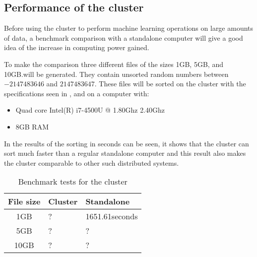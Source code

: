 \subsection{Performance of the cluster}\label{sec:benchmark}
Before using the cluster to perform machine learning operations on large amounts of data, a benchmark comparison with a standalone computer will give a good idea of the increase in computing power gained.

To make the comparison three different files of the sizes 1GB, 5GB, and 10GB.\@ will be generated. They contain unsorted random numbers between $-2147483646$ and $2147483647$. These files will be sorted on the cluster with the specifications seen in , and on a computer with:
\begin{itemize}
\item Quad core Intel(R) i7-4500U @ 1.80Ghz 2.40Ghz
\item 8GB RAM
\end{itemize}

In  the results of the sorting in seconds can be seen, it shows that the cluster can sort much faster than a regular standalone computer and this result also makes the cluster comparable to other such distributed systems.

\begin{table}[!htb]
  \centering
  \begin{tabular}{|c|ll|}
    \hline
    File size & Cluster  & Standalone \\
    \hline
    1GB & ? & 1651.61seconds \\
    5GB & ? & ? \\
    10GB & ? & ? \\
    \hline
  \end{tabular}
  \caption{Benchmark tests for the cluster}
  \label{tab:bench}
\end{table}




